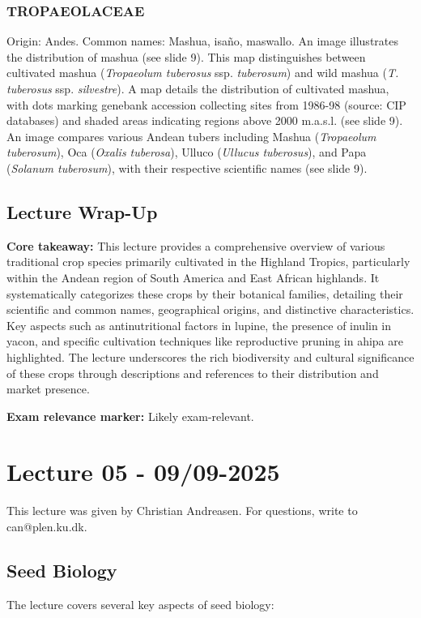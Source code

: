 \subsubsection{TROPAEOLACEAE} 
Origin: Andes. Common names: Mashua, isaño, maswallo. An image illustrates the distribution of mashua (see slide 9). This map distinguishes between cultivated mashua (\textit{Tropaeolum tuberosus} ssp. \textit{tuberosum}) and wild mashua (\textit{T. tuberosus} ssp. \textit{silvestre}). A map details the distribution of cultivated mashua, with dots marking genebank accession collecting sites from 1986-98 (source: CIP databases) and shaded areas indicating regions above 2000 m.a.s.l. (see slide 9). An image compares various Andean tubers including Mashua (\textit{Tropaeolum tuberosum}), Oca (\textit{Oxalis tuberosa}), Ulluco (\textit{Ullucus tuberosus}), and Papa (\textit{Solanum tuberosum}), with their respective scientific names (see slide 9).


\subsection*{Lecture Wrap-Up} \textbf{Core takeaway:} 
This lecture provides a comprehensive overview of various traditional crop species primarily cultivated in the Highland Tropics, particularly within the Andean region of South America and East African highlands. It systematically categorizes these crops by their botanical families, detailing their scientific and common names, geographical origins, and distinctive characteristics. Key aspects such as antinutritional factors in lupine, the presence of inulin in yacon, and specific cultivation techniques like reproductive pruning in ahipa are highlighted. The lecture underscores the rich biodiversity and cultural significance of these crops through descriptions and references to their distribution and market presence. 

\vspace{1em} \textbf{Exam relevance marker:} Likely exam-relevant.

\section{Lecture 05 - 09/09-2025}
This lecture was given by Christian Andreasen. For questions, write to can@plen.ku.dk.
\subsection{Seed Biology} 
The lecture covers several key aspects of seed biology: 


